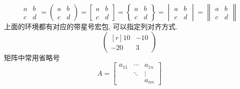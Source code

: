 \documentclass[UTF8,no-math]{ctexart}
\numberwithin{enumi}{section}
\begin{document}
\begin{enumerate}
\begin{equation}
        \begin{matrix}
        a & b\\c & d
        \end{matrix}= 
        \begin{pmatrix}
        a & b\\c & d
        \end{pmatrix}=
        \begin{bmatrix}
        a & b\\c & d
        \end{bmatrix}=
        \begin{Bmatrix}
        a & b\\c & d
        \end{Bmatrix}=
        \begin{vmatrix}
        a & b\\c & d
        \end{vmatrix}=
        \begin{Vmatrix}
        a & b\\c & d
        \end{Vmatrix}
        \end{equation}
        上面的环境都有对应的带星号宏包, 可以指定列对齐方式. 
        \begin{equation}
        \begin{pmatrix*}[r]
        10 & -10 \\ -20 & 3
        \end{pmatrix*}
        \end{equation}
        矩阵中常用省略号
        \begin{equation}
        A=\begin{bmatrix}
        a_{11} & \cdots & a_{1n} \\
        & \ddots & \vdots \\
        && a_{nn}
        \end{bmatrix}
        \end{equation}
        

\end{enumerate}
\end{document}
